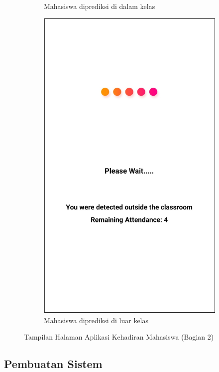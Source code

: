 \begin{enumerate}[a.]
\begin{enumerate}[a.]
\begin{figure} [H]
\begin{subfigure}{.5\textwidth}
			      \caption{Mahasiswa diprediksi di dalam kelas}
		      \end{subfigure}
		      \begin{subfigure}{.5\textwidth}
			      \centering
			      \includegraphics[width=.5\linewidth]{gambar/android/mahasiswa-8}
			      \caption{Mahasiswa diprediksi di luar kelas}
		      \end{subfigure}
		      \vspace{0.5cm}
		      \caption{Tampilan Halaman Aplikasi Kehadiran Mahasiswa (Bagian 2)}
		      \label{aplikasimahasiswabagian2}
	      \end{figure}


\end{enumerate}

\subsection{Pembuatan Sistem}


\end{enumerate}
